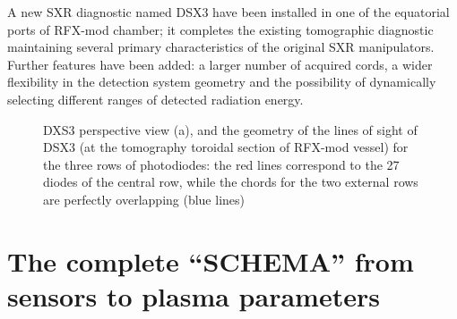 A new SXR diagnostic named DSX3 have been installed in one of the equatorial ports of RFX-mod chamber; it completes the existing tomographic diagnostic maintaining several primary characteristics of the original SXR manipulators. Further
features have been added: a larger number of acquired cords, a wider flexibility in the detection system geometry and the possibility of dynamically selecting different ranges of detected radiation energy.



\begin{figure}
    \centering
    \caption{DXS3 perspective view (a), and the geometry of the lines of sight of DSX3 (at the tomography toroidal section
             of RFX-mod vessel) for the three rows of photodiodes: the red lines correspond to the
             27 diodes of the central row, while the chords for the two external rows are perfectly
             overlapping (blue lines) }
    \label{fig:DSX3_sketch}
\end{figure}




\section{The complete “SCHEMA” from sensors to plasma parameters}
